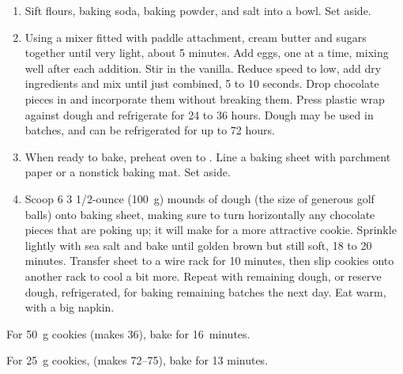 
\begin{ingredients}
\end{ingredients}


\begin{recipe}
  \begin{enumerate}

  \item Sift flours, baking soda, baking powder, and salt into a bowl.
    Set aside.

  \item   Using a mixer fitted with paddle attachment, cream butter
    and sugars together until very light, about 5 minutes. Add eggs,
    one at a time, mixing well after each addition. Stir in the
    vanilla. Reduce speed to low, add dry ingredients and mix until
    just combined, 5 to 10 seconds. Drop chocolate pieces in and
    incorporate them without breaking them. Press plastic wrap against
    dough and refrigerate for 24 to 36 hours. Dough may be used in
    batches, and can be refrigerated for up to 72 hours.

  \item   When ready to bake, preheat oven to . Line a
    baking sheet with parchment paper or a nonstick baking mat. Set
    aside.

  \item   Scoop 6 3 1/2-ounce (100~g) mounds of dough (the size of generous
    golf balls) onto baking sheet, making sure to turn horizontally
    any chocolate pieces that are poking up; it will make for a more
    attractive cookie. Sprinkle lightly with sea salt and bake until
    golden brown but still soft, 18 to 20 minutes. Transfer sheet to a
    wire rack for 10 minutes, then slip cookies onto another rack to
    cool a bit more. Repeat with remaining dough, or reserve dough,
    refrigerated, for baking remaining batches the next day. Eat warm,
    with a big napkin.

  \end{enumerate}

  For 50~g cookies (makes 36), bake for 16~minutes.

  For 25~g cookies, (makes 72--75), bake for 13 minutes.
\end{recipe}
